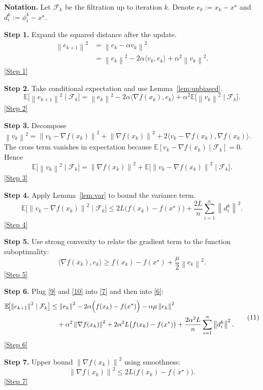 \documentclass[12pt]{article}
\newcommand{\E}{\mathbb{E}}
\newcommand{\grad}{\nabla}
\newcommand{\norm}[1]{\left\| #1\right\|}
\newcommand{\inner}[2]{\langle #1,#2\rangle}
\begin{document}
\noindent\textbf{Notation.} Let $\mathcal{F}_k$ be the filtration up to iteration $k$. Denote $e_k:=x_k-x^{\star}$ and $d_i^{k}:=\phi_i^{k}-x^{\star}$.

\noindent\textbf{Step 1.} Expand the squared distance after the update.
\[
\begin{aligned}
\norm{e_{k+1}}^{2}
&=\norm{e_k-\alpha v_k}^{2}\\
&=\norm{e_k}^{2}-2\alpha\inner{v_k}{e_k}+\alpha^{2}\norm{v_k}^{2}. \tag{6}
\end{aligned}
\]
\noindent\underline{[Step 1]}

\noindent\textbf{Step 2.} Take conditional expectation and use Lemma~\ref{lem:unbiased}.
\[
\E\!\bigl[\norm{e_{k+1}}^{2}\mid\mathcal{F}_k\bigr]
= \norm{e_k}^{2}
-2\alpha\inner{\grad f(x_k)}{e_k}
+\alpha^{2}\E\!\bigl[\norm{v_k}^{2}\mid\mathcal{F}_k\bigr]. \tag{7}
\]
\underline{[Step 2]}

\noindent\textbf{Step 3.} Decompose $\norm{v_k}^{2} = \norm{v_k-\grad f(x_k)}^{2}+\norm{\grad f(x_k)}^{2}+2\inner{v_k-\grad f(x_k)}{\grad f(x_k)}$.
The cross term vanishes in expectation because $\E[v_k-\grad f(x_k)\mid\mathcal{F}_k]=0$.
Hence
\[
\E\!\bigl[\norm{v_k}^{2}\mid\mathcal{F}_k\bigr]
= \norm{\grad f(x_k)}^{2}
   +\E\!\bigl[\norm{v_k-\grad f(x_k)}^{2}\mid\mathcal{F}_k\bigr]. \tag{8}
\]
\underline{[Step 3]}

\noindent\textbf{Step 4.} Apply Lemma~\ref{lem:var} to bound the variance term.
\[
\E\!\bigl[\norm{v_k-\grad f(x_k)}^{2}\mid\mathcal{F}_k\bigr]
\le 2L\bigl(f(x_k)-f(x^{\star})\bigr)
   +\frac{2L}{n}\sum_{i=1}^{n}\norm{d_i^{k}}^{2}. \tag{9}
\]
\underline{[Step 4]}

\noindent\textbf{Step 5.} Use strong convexity to relate the gradient term to the function suboptimality:
\[
\inner{\grad f(x_k)}{e_k}\ge f(x_k)-f(x^{\star})+\frac{\mu}{2}\norm{e_k}^{2}. \tag{10}
\]
\underline{[Step 5]}

\noindent\textbf{Step 6.} Plug \eqref{9} and \eqref{10} into \eqref{7} and then into \eqref{6}:
\[
\begin{aligned}
\E\!\bigl[\norm{e_{k+1}}^{2}\mid\mathcal{F}_k\bigr]
&\le \norm{e_k}^{2}
-2\alpha\Bigl(f(x_k)-f(x^{\star})\Bigr)
-\alpha\mu \norm{e_k}^{2}\\
&\quad+\alpha^{2}\norm{\grad f(x_k)}^{2}
+2\alpha^{2}L\bigl(f(x_k)-f(x^{\star})\bigr)
+\frac{2\alpha^{2}L}{n}\sum_{i=1}^{n}\norm{d_i^{k}}^{2}.
\end{aligned}
\tag{11}
\]
\underline{[Step 6]}

\noindent\textbf{Step 7.} Upper bound $\norm{\grad f(x_k)}^{2}$ using smoothness:
\[
\norm{\grad f(x_k)}^{2}
\le 2L\bigl(f(x_k)-f(x^{\star})\bigr). \tag{12}
\]
\underline{[Step 7]}
\end{document}
